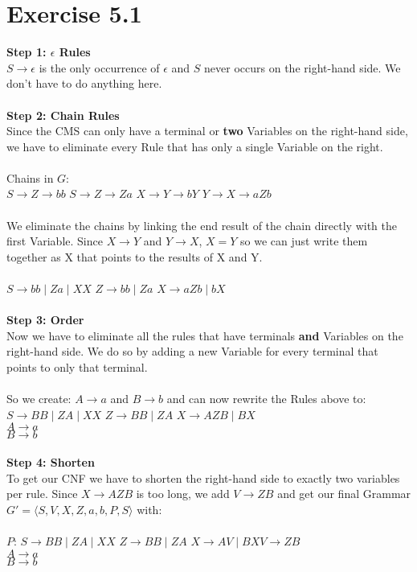 \documentclass{article} %
\newcommand{\homeworkNumber}{5}
\begin{document}
\section*{Exercise \homeworkNumber.1}
\textbf{Step 1: $\epsilon$ Rules} \\
$S \to \epsilon$ is the only occurrence of $\epsilon$ and $S$ never occurs on the right-hand side. We don't have to do anything here.\\\\
\textbf{Step 2: Chain Rules}\\
Since the CMS can only have a terminal or \textbf{two} Variables on the right-hand side, we have to eliminate every Rule that has only a single Variable on the right.\\\\
Chains in $G$:\\
$S \to Z \to bb$ \qquad \qquad $S \to Z \to Za$ \qquad \qquad $X \to Y \to bY$ \qquad \qquad $Y \to X \to aZb$\\\\
We eliminate the chains by linking the end result of the chain directly with the first Variable. Since $X \to Y$ and $Y \to X$, $X = Y$ so we can just write them together as X that points to the results of X and Y.\\\\
$S \to bb \mid Za \mid XX$ \qquad \qquad $Z \to bb \mid Za$ \qquad \qquad $X \to aZb \mid bX$\\\\
\textbf{Step 3: Order}\\
Now we have to eliminate all the rules that have terminals \textbf{and} Variables on the right-hand side. We do so by adding a new Variable for every terminal that points to only that terminal.\\\\
So we create: $A \to a$ and $B \to b$ and can now rewrite the Rules above to:\\
$S \to BB \mid ZA \mid XX$ \qquad \qquad $Z \to BB \mid ZA$ \qquad \qquad $X \to AZB \mid BX$\\
$A \to a$\\
$B \to b$\\\\
\textbf{Step 4: Shorten}\\
To get our CNF we have to shorten the right-hand side to exactly two variables per rule. Since $X \to AZB$ is too long, we add $V \to ZB$ and get our final Grammar $G' = \langle {S, V, X, Z},{a,b}, P, S\rangle$ with:\\\\
$P$: $S \to BB \mid ZA \mid XX$ \qquad \qquad $Z \to BB \mid ZA$ \qquad \qquad $X \to AV \mid BX$\qquad \qquad $V \to ZB$\\
$A \to a$\\
$B \to b$\\
\clearpage
\end{document}
